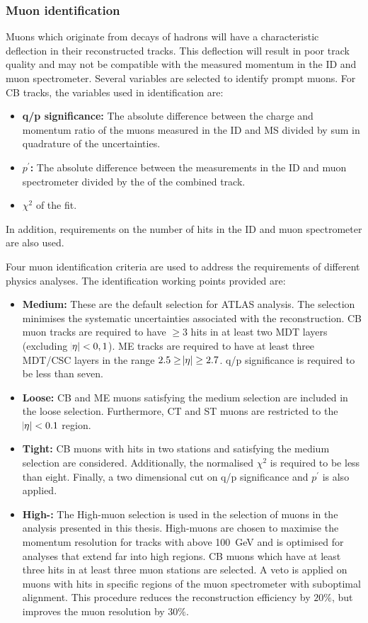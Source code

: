 \subsubsection{Muon identification}
Muons which originate from decays of hadrons will have a characteristic deflection in their reconstructed tracks. This deflection will result in poor track quality and may not be compatible with the measured momentum in the ID and muon spectrometer. Several variables are selected to identify prompt muons. For CB tracks, the variables used in identification are:
\begin{itemize}
    \item \textbf{q/p significance:} The absolute difference between the charge and momentum ratio of the muons measured in the ID and MS divided by sum in quadrature of the uncertainties. 
    \item \textbf{$p^\prime$:} The absolute difference between the \pt measurements in the ID and muon spectrometer divided by the \pt of the combined track.
    \item $\chi^2$ of the fit.
\end{itemize}
In addition, requirements on the number of hits in the ID and muon spectrometer are also used. 

Four muon identification criteria are used to address the requirements of different physics analyses. The identification working points provided are: 
\begin{itemize}
    \item \textbf{Medium:} These are the default selection for ATLAS analysis. The selection minimises the systematic uncertainties associated with the reconstruction. CB muon tracks are required to have $\geq 3$ hits in at least two MDT layers (excluding $\abs{\eta} < 0,1$). ME tracks are required to have at least three MDT/CSC layers in the range $2.5 \geq \abs{\eta} \geq 2.7$. q/p significance is required to be less than seven.
    \item \textbf{Loose:} CB and ME muons satisfying the medium selection are included in the loose selection. Furthermore, CT and ST muons are restricted to the $\abs{\eta} < 0.1$ region.
    \item \textbf{Tight:} CB muons with hits in two stations and satisfying the medium selection are considered. Additionally, the normalised $\chi^2$ is required to be less than eight. Finally, a two dimensional cut on q/p significance and \emph{$p^\prime$} is also applied. 
    \item \textbf{High-\pt:} The High-\pt muon selection is used in the selection of muons in the analysis presented in this thesis. High-\pt muons are chosen to maximise the momentum resolution for tracks with \pt above \SI{100}{\giga\electronvolt} and is optimised for analyses that extend far into high \pt regions. CB muons which have at least three hits in at least three muon stations are selected. A veto is applied on muons with hits in specific regions of the muon spectrometer with suboptimal alignment. This procedure reduces the reconstruction efficiency by $20\%$, but improves the muon \pt resolution by $30\%$.
\end{itemize}

